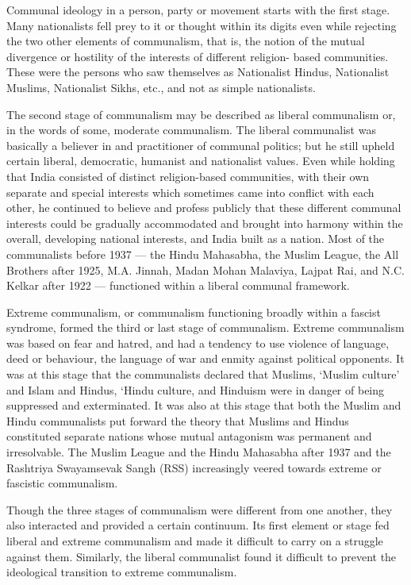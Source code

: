 Communal ideology in a person, party or movement starts with the first stage. Many nationalists fell prey to it or thought within its digits even while rejecting the two other elements of communalism, that is, the notion of the mutual divergence or hostility of the interests of different religion- based communities. These were the persons who saw themselves as Nationalist Hindus, Nationalist Muslims, Nationalist Sikhs, etc., and not as simple nationalists. 

The second stage of communalism may be described as liberal communalism or, in the words of some, moderate communalism. The liberal communalist was basically a believer in and practitioner of communal politics; but he still upheld certain liberal, democratic, humanist and nationalist values. Even while holding that India consisted of distinct religion-based communities, with their own separate and special interests which sometimes came into conflict with each other, he continued to believe and profess publicly that these different communal interests could be gradually accommodated and brought into harmony within the overall, developing national interests, and India built as a nation. Most of the communalists before 1937 --- the Hindu Mahasabha, the Muslim League, the All Brothers after 1925, M.A. Jinnah, Madan Mohan Malaviya, Lajpat Rai, and N.C. Kelkar after 1922 --- functioned within a liberal communal framework. 

Extreme communalism, or communalism functioning broadly within a fascist syndrome, formed the third or last stage of communalism. Extreme communalism was based on fear and hatred, and had a tendency to use violence of language, deed or behaviour, the language of war and enmity against political opponents. It was at this stage that the communalists declared that Muslims, `Muslim culture' and Islam and Hindus, `Hindu culture, and Hinduism were in danger of being suppressed and exterminated. It was also at this stage that both the Muslim and Hindu communalists put forward the theory that Muslims and Hindus constituted separate nations whose mutual antagonism was permanent and irresolvable. The Muslim League and the Hindu Mahasabha after 1937 and the Rashtriya Swayamsevak Sangh (RSS) increasingly veered towards extreme or fascistic communalism. 

Though the three stages of communalism were different from one another, they also interacted and provided a certain continuum. Its first element or stage fed liberal and extreme communalism and made it difficult to carry on a struggle against them. Similarly, the liberal communalist found it difficult to prevent the ideological transition to extreme communalism. 

